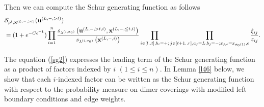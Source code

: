\documentclass[11pt]{amsart}
\theoremstyle{plain}
\theoremstyle{definition}
\theoremstyle{remark}
\newcommand\si{\sigma}
\numberwithin{equation}{section}
\numberwithin{theorem}{section}
\numberwithin{figure}{section}
\begin{document}
 Then we can compute the Schur generating function as follows
\begin{align}
&\mathcal{S}_{\rho^t,\mathbf{x}^{(L,-,> t)}}(\mathbf{u}^{(L,-,> t)})\label{sg2}\\
&=(1+e^{-C\mathbf{\epsilon^{-1}}})
\prod_{i=1}^{n}
\frac{s_{\lambda^{(i,\sigma_0)}}\left(\mathbf{u}^{(L,-,>t,i)},\mathbf{x}^{(L,-,\leq t,i)}\right)}{s_{\lambda^{(i,\sigma_0)}}\left(\mathbf{x}^{(L,-,i)}\right)}
\prod_{i\in[l..t],b_i=+;}\prod_{j\in[t+1..r],a_j=L,b_j=-;x_{j,\epsilon}=x_{\si_0(1)},\epsilon}\frac{\xi_{ij}}{z_{ij}}.\notag
\end{align}

The equation (\ref{sg2}) expresses the leading term of the Schur generating function as a product of factors indexed by $i$ $(1\le i\le n)$. In Lemma \ref{l46} below, we show that each $i$-indexed factor can be written as the Schur generating function with respect to the probability measure on dimer coverings with modified left boundary conditions and edge weights.
\end{document}
